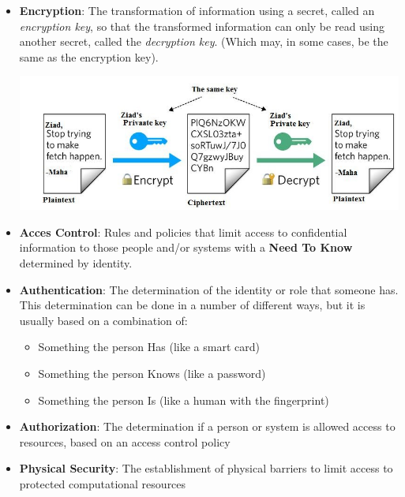 \documentclass{article}
\begin{document}
\begin{itemize}
    \item \textbf{Encryption}: The transformation of 
    information using a secret, called an \textit{encryption key},
    so that the transformed information can only be read using
    another secret, called the \textit{decryption key}. (Which may, in some cases,
    be the same as the encryption key).

\begin{center}
    \includegraphics[scale=0.35]{Images/Data-encryption-decryption-process.png}
\end{center}

    \item \textbf{Acces Control}: Rules and policies that limit
    access to confidential information to those people and/or systems
    with a \textbf{Need To Know} determined by identity.
    
    \item \textbf{Authentication}: The determination of the identity or role that someone 
    has. This determination can be done in a number of different ways, but it is usually
    based on a combination of:
    \begin{itemize}
        \item Something the person Has (like a smart card)
        \item Something the person Knows (like a password)
        \item Something the person Is (like a human with the fingerprint)
    \end{itemize}

    \item \textbf{Authorization}: The determination if a person or system is allowed access to 
    resources, based on an access control policy

    \item \textbf{Physical Security}: The establishment of physical barriers to limit
    access to protected computational resources
\end{itemize}
\end{document}
